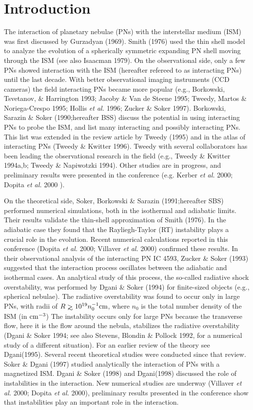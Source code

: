 \section{Introduction}
The interaction of planetary nebulae (PNs) with the interstellar medium (ISM)
was first discussed by Gurzadyan (1969). Smith (1976) used the thin shell model
to analyze the evolution of a spherically symmetric expanding PN shell
moving through the ISM (see also Isaacman 1979). 
On the observational side, only a few PNs showed interaction with the ISM 
(hereafter refereed to as interacting PNs) until the last decade.
With better observational imaging instruments (CCD cameras) the field
interacting PNs became more popular 
(e.g., Borkowski, Tsvetanov, \& Harrington 1993; Jacoby \& Van de Steene 1995;
Tweedy, Martos \& Noriega-Crespo 1995; Hollis {\it et al.} 1996;
Zucker \& Soker 1997). Borkowski, Sarazin \& Soker (1990;hereafter  BSS) discuss
the potential in using interacting PNs to probe the ISM, and list many 
interacting and possibly interacting PNs.
This list was extended in the review article by Tweedy (1995)
and in the atlas of interacting PNs (Tweedy \& Kwitter 1996). Tweedy 
with several collaborators has been leading the observational research
in the field (e.g., Tweedy \& Kwitter 1994a,b; Tweedy \& Napiwotzki 1994).
Other studies are in progress, and preliminary 
results were presented in the conference (e.g. Kerber {\it et al.} 2000;
Dopita {\it et al.} 2000 ).

On the theoretical side, Soker, Borkowski \& Sarazin (1991;hereafter
SBS) performed numerical simulations, both in the isothermal and adiabatic 
limits.
Their results validate the thin-shell approximation of Smith (1976).
In the adiabatic case they found that the Rayliegh-Taylor (RT)
instability plays a crucial role in the evolution.
Recent numerical calculations reported in this conference 
(Dopita {\it et al.} 2000; Villaver {\it et al.} 2000) confirmed these 
results. In their observational analysis of the interacting PN IC 4593,
Zucker \& Soker (1993) suggested that the interaction process oscillates
between the adiabatic and isothermal cases.
An analytical study of this process, the so-called radiative shock
overstability, was performed by Dgani \& Soker (1994) for finite-sized
objects (e.g., spherical nebulae).
The radiative overstability was found to occur only in large
PNs, with radii of $R \gae 10^{19} n_0^{-1} \cm$, where $n_0$ is the
total number density of the ISM (in $\rm{cm}^{-3}$)
The instability occurs only for large PNs because  the transverse
flow, here it is the flow around the nebula, stabilizes the radiative
overstability (Dgani \& Soker 1994; see also
Stevens, Blondin \& Pollock 1992, for a numerical study of a different
situation). 
For an earlier review of the theory see Dgani(1995).
Several recent theoretical studies were conducted since that review.  
Soker \& Dgani (1997) studied analytically the interaction
of PNs with a magnetized ISM. Dgani \& Soker (1998) and Dgani(1998)  discussed
the role of instabilities in the interaction. 
New numerical studies are underway (Villaver {\it et al.} 2000; 
Dopita {\it et al.} 2000), preliminary results presented in the conference
show that instabilities play an important role in the interaction.

